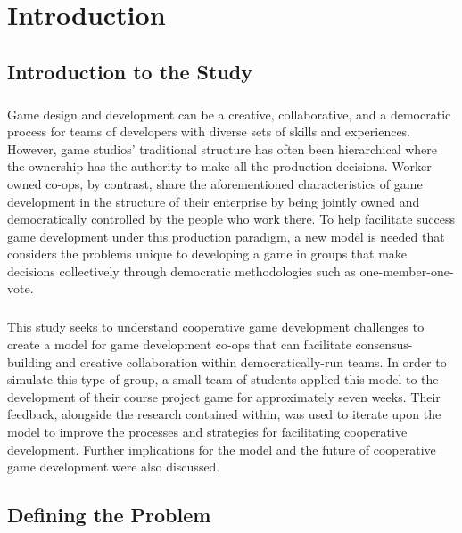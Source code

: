 \chapter{Introduction}


\section{Introduction to the Study}


\paragraph{} Game design and development can be a creative, collaborative, and a democratic process for teams of developers with diverse sets of skills and experiences. However, game studios' traditional structure has often been hierarchical where the ownership has the authority to make all the production decisions. Worker-owned co-ops, by contrast, share the aforementioned characteristics of game development in the structure of their enterprise by being jointly owned and democratically controlled by the people who work there. To help facilitate success game development under this production paradigm, a new model is needed that considers the problems unique to developing a game in groups that make decisions collectively through democratic methodologies such as one-member-one-vote.

\paragraph{} This study seeks to understand cooperative game development challenges to create a model for game development co-ops that can facilitate consensus-building and creative collaboration within democratically-run teams. In order to simulate this type of group, a small team of students applied this model to the development of their course project game for approximately seven weeks. Their feedback, alongside the research contained within, was used to iterate upon the model to improve the processes and strategies for facilitating cooperative development. Further implications for the model and the future of cooperative game development were also discussed. 

\section{Defining the Problem}

